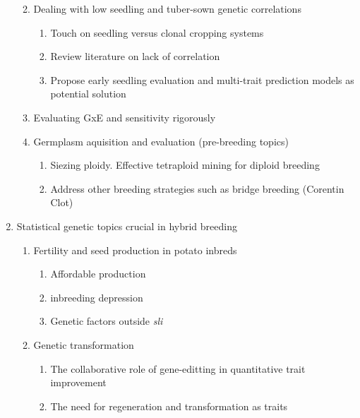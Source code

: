\documentclass[
]{article}
\providecommand{\tightlist}{%
  \setlength{\itemsep}{0pt}\setlength{\parskip}{0pt}}\usepackage{longtable,booktabs,array}
\begin{document}
\begin{enumerate}
  \begin{enumerate}
  \def\labelenumii{\roman{enumii})}
  \tightlist
  \item
    Dealing with low seedling and tuber-sown genetic correlations

    \begin{enumerate}
    \def\labelenumiii{\Alph{enumiii}.}
    \tightlist
    \item
      Touch on seedling versus clonal cropping systems
    \item
      Review literature on lack of correlation
    \item
      Propose early seedling evaluation and multi-trait prediction
      models as potential solution
    \end{enumerate}
  \item
    Evaluating GxE and sensitivity rigorously
  \item
    Germplasm aquisition and evaluation (pre-breeding topics)

    \begin{enumerate}
    \def\labelenumiii{\Alph{enumiii}.}
    \tightlist
    \item
      Siezing ploidy. Effective tetraploid mining for diploid breeding
    \item
      Address other breeding strategies such as bridge breeding
      (Corentin Clot)
    \end{enumerate}
  \end{enumerate}
\item
  Statistical genetic topics crucial in hybrid breeding

  \begin{enumerate}
  \def\labelenumii{\roman{enumii})}
  \tightlist
  \item
    Fertility and seed production in potato inbreds

    \begin{enumerate}
    \def\labelenumiii{\Alph{enumiii}.}
    \tightlist
    \item
      Affordable production
    \item
      inbreeding depression
    \item
      Genetic factors outside \emph{sli}
    \end{enumerate}
  \item
    Genetic transformation

    \begin{enumerate}
    \def\labelenumiii{\Alph{enumiii}.}
    \tightlist
    \item
      The collaborative role of gene-editting in quantitative trait
      improvement
    \item
      The need for regeneration and transformation as traits


\end{enumerate}
\end{enumerate}
\end{enumerate}
\end{document}
